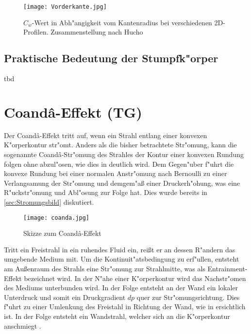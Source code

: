 \begin{figure}[h]
	\centering	\texttt{[image: Vorderkante.jpg]}
	\caption{$C_w$-Wert in Abh"angigkeit vom Kantenradius bei verschiedenen 2D-Profilen. Zusammenstellung nach Hucho\cite{Hucho.1972}}
	\label{fig:Vorderkante}
\end{figure}




\subsection{Praktische Bedeutung der Stumpfk"orper}
tbd



\section{Coand\^{a}-Effekt (TG)}

Der Coand\^{a}-Effekt tritt auf, wenn ein Strahl entlang einer konvexen K"orperkontur str"omt. Anders als die bisher betrachtete Str"omung, kann die sogenannte Coand\^{a}-Str"omung des Strahles der Kontur einer konvexen Rundung folgen ohne abzul"osen, wie dies in  deutlich wird. Dem Gegen"uber f"uhrt die konvexe Rundung bei einer normalen Anstr"omung nach Bernoulli zu einer Verlangsamung der Str"omung und demgem"a\ss{} einer Druckerh"ohung, was eine R"uckstr"omung und Abl"osung zur Folge hat. Dies wurde bereits in \ref{sec:Stromungsbild} diskutiert.

\begin{figure}[h]
	\centering
	\texttt{[image: coanda.jpg]}
	\caption{Skizze zum Coand\^{a}-Effekt \cite{Stadlberger.2016}}
	\label{fig:coanda}
\end{figure}

Tritt ein Freistrahl in ein ruhendes Fluid ein, rei\ss{}t er an dessen R"andern das umgebende Medium mit. Um die Kontinuit"atsbedingung zu erf"ullen, entsteht am Au\ss{}enraum des Strahls eine Str"omung zur Strahlmitte, was als Entrainment-Effekt bezeichnet wird. In der N"ahe einer K"orperkontur wird das Nachstr"omen des Mediums unterbunden wird. In der Folge entsteht an der Wand ein lokaler Unterdruck und somit ein Druckgradient $dp$ quer zur Str"omungsrichtung. Dies f"uhrt zu einer Umlenkung des Freistahl in Richtung der Wand, wie in  ersichtlich ist. In der Folge entsteht ein Wandstrahl, welcher sich an die K"orperkontur anschmiegt \cite{Fernholz.1966}. 

